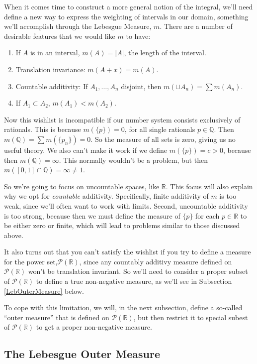 \documentclass[12pt]{article}
\theoremstyle{plain}
\theoremstyle{definition}
\theoremstyle{remark}
\begin{document}
When it comes time to construct a more general notion of the integral, we'll need define a new way to express the weighting of intervals in our domain, something we'll accomplish through the Lebesgue Measure, $m$. There are a number of desirable features that we would like $m$ to have:
\begin{enumerate}
    \item If $A$ is in an interval, $m(A) = |A|$, the length of the interval.
    \item Translation invariance: $m(A+x) = m(A)$.
    \item Countable additivity: If $A_1, \ldots, A_n$ disjoint, then $m(\cup A_n) = \sum m(A_n)$. 
    \item If $A_1 \subset A_2$, $m(A_1) < m(A_2)$.
\end{enumerate}
Now this wishlist is incompatible if our number system consists exclusively of rationals. This is because $m(\{p\}) = 0$, for all single rationals $p\in\mathbb{Q}$. Then $m(\mathbb{Q})=\sum m(\{p_n\}) = 0$. So the measure of all sets is zero, giving us no useful theory. We also can't make it work if we define $m(\{p\})=c>0$, because then $m(\mathbb{Q})=\infty$. This normally wouldn't be a problem, but then $m([0,1]\cap \mathbb{Q}) = \infty \neq 1$. 

So we're going to focus on uncountable spaces, like $\mathbb{R}$. This focus will also explain why we opt for \emph{countable} additivity. Specifically, finite additivity of $m$ is too weak, since we'll often want to work with limits. Second, uncountable additivity is too strong, because then we must define the measure of $\{p\}$ for each $p\in\mathbb{R}$ to be either zero or finite, which will lead to problems similar to those discussed above.

It also turns out that you can't satisfy the wishlist if you try to define a measure for the power set,$\mathscr{P}(\mathbb{R})$, since any countably additivy measure defined on $\mathscr{P}(\mathbb{R})$ won't be translation invariant.  So we'll need to consider a proper subset of $\mathscr{P}(\mathbb{R})$ to define a true non-negative measure, as we'll see in Subsection \ref{LebOuterMeasure} below.

To cope with this limitation, we will, in the next subsection, define a so-called ``outer measure'' that is defined on $\mathscr{P}(\mathbb{R})$, but then restrict it to special subest of $\mathscr{P}(\mathbb{R})$ to get a proper non-negative measure.


\subsection{The Lebesgue Outer Measure\label{LebOuterMeasure}}
\end{document}
